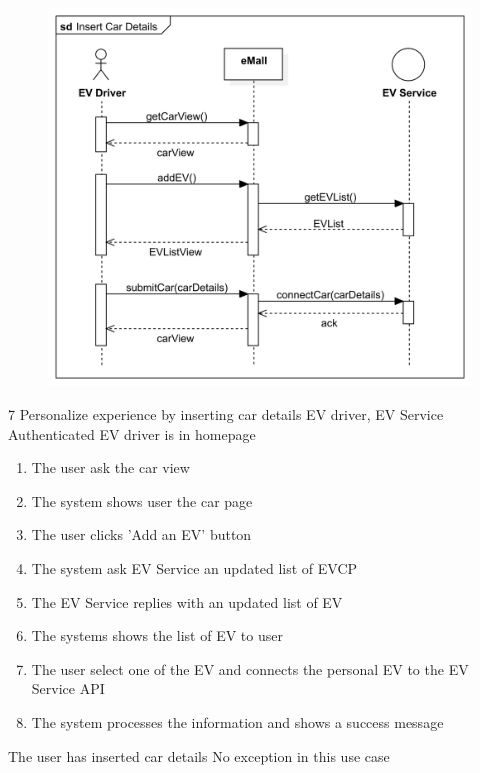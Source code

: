 \usecase
{
    \begin{figure}[H]
        \centering
        \includegraphics[scale=0.9]{src/sequence_diagram/insertCar.png}
    \end{figure}
}
{7}
{Personalize experience by inserting car details}
{EV driver, EV Service}
{Authenticated EV driver is in homepage}
{
    \begin{enumerate}
        \item The user ask the car view
        \item The system shows user the car page
        \item The user clicks 'Add an EV' button
        \item The system ask EV Service an updated list of EVCP
        \item The EV Service replies with an updated list of EV
        \item The systems shows the list of EV to user
        \item The user select one of the EV and connects the personal EV to the EV Service API
        \item The system processes the information and shows a success message
    \end{enumerate}
}
{The user has inserted car details}
{
    No exception in this use case
}
{
}

